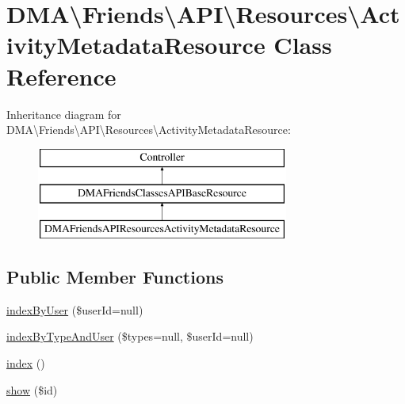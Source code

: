 \hypertarget{classDMA_1_1Friends_1_1API_1_1Resources_1_1ActivityMetadataResource}{}\section{D\+M\+A\textbackslash{}Friends\textbackslash{}A\+P\+I\textbackslash{}Resources\textbackslash{}Activity\+Metadata\+Resource Class Reference}
\label{classDMA_1_1Friends_1_1API_1_1Resources_1_1ActivityMetadataResource}
Inheritance diagram for D\+M\+A\textbackslash{}Friends\textbackslash{}A\+P\+I\textbackslash{}Resources\textbackslash{}Activity\+Metadata\+Resource\+:\begin{figure}[H]
\begin{center}
\leavevmode
\includegraphics[height=3.000000cm]{d3/d5d/classDMA_1_1Friends_1_1API_1_1Resources_1_1ActivityMetadataResource}
\end{center}
\end{figure}
\subsection*{Public Member Functions}
\begin{DoxyCompactItemize}
\item 
\hyperlink{classDMA_1_1Friends_1_1API_1_1Resources_1_1ActivityMetadataResource_ae6a01ce9c7882d3c741f471557d5a8f2}{index\+By\+User} (\$user\+Id=null)
\item 
\hyperlink{classDMA_1_1Friends_1_1API_1_1Resources_1_1ActivityMetadataResource_a489377740bd451341a243ba778b65e68}{index\+By\+Type\+And\+User} (\$types=null, \$user\+Id=null)
\item 
\hyperlink{classDMA_1_1Friends_1_1API_1_1Resources_1_1ActivityMetadataResource_adcd1fde2ccc77d6f698cbf63c2b1add8}{index} ()
\item 
\hyperlink{classDMA_1_1Friends_1_1API_1_1Resources_1_1ActivityMetadataResource_aa87d629932ed257089513010323e6f7e}{show} (\$id)
\end{DoxyCompactItemize}
